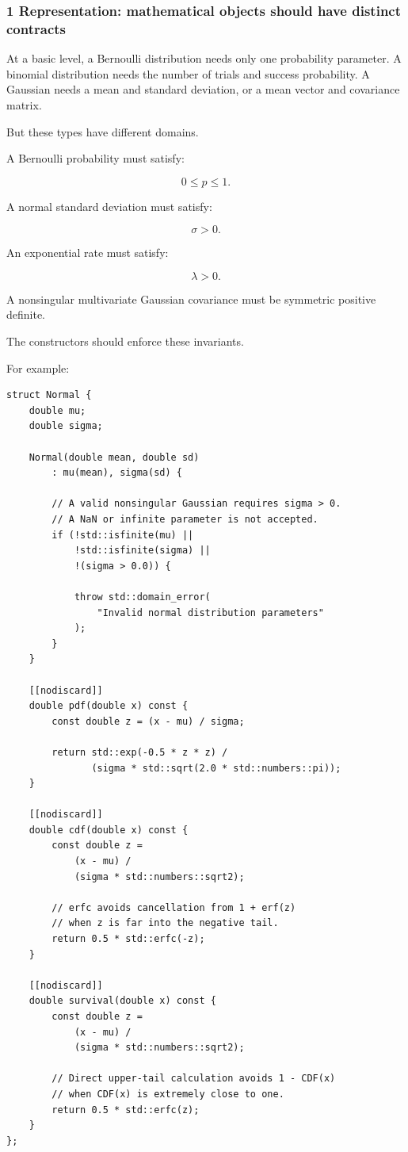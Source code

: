 \subsubsection{1 Representation: mathematical objects should have distinct contracts}\label{02-foundations-ii-ch031-representation-mathematical-objects-should-have-distinct-contracts}

\hypertarget{02-foundations-ii-ch031-representation-mathematical-objects-should-have-distinct-contracts}{}

At a basic level, a Bernoulli distribution needs only one probability parameter. A binomial distribution needs the number of trials and success probability. A Gaussian needs a mean and standard deviation, or a mean vector and covariance matrix.

But these types have different domains.

A Bernoulli probability must satisfy:

\[
 0\le p\le1.
\]

A normal standard deviation must satisfy:

\[
 \sigma>0.
\]

An exponential rate must satisfy:

\[
 \lambda>0.
\]

A nonsingular multivariate Gaussian covariance must be symmetric positive definite.

The constructors should enforce these invariants.

For example:

\begin{verbatim}
struct Normal {
    double mu;
    double sigma;

    Normal(double mean, double sd)
        : mu(mean), sigma(sd) {

        // A valid nonsingular Gaussian requires sigma > 0.
        // A NaN or infinite parameter is not accepted.
        if (!std::isfinite(mu) ||
            !std::isfinite(sigma) ||
            !(sigma > 0.0)) {

            throw std::domain_error(
                "Invalid normal distribution parameters"
            );
        }
    }

    [[nodiscard]]
    double pdf(double x) const {
        const double z = (x - mu) / sigma;

        return std::exp(-0.5 * z * z) /
               (sigma * std::sqrt(2.0 * std::numbers::pi));
    }

    [[nodiscard]]
    double cdf(double x) const {
        const double z =
            (x - mu) /
            (sigma * std::numbers::sqrt2);

        // erfc avoids cancellation from 1 + erf(z)
        // when z is far into the negative tail.
        return 0.5 * std::erfc(-z);
    }

    [[nodiscard]]
    double survival(double x) const {
        const double z =
            (x - mu) /
            (sigma * std::numbers::sqrt2);

        // Direct upper-tail calculation avoids 1 - CDF(x)
        // when CDF(x) is extremely close to one.
        return 0.5 * std::erfc(z);
    }
};
\end{verbatim}

